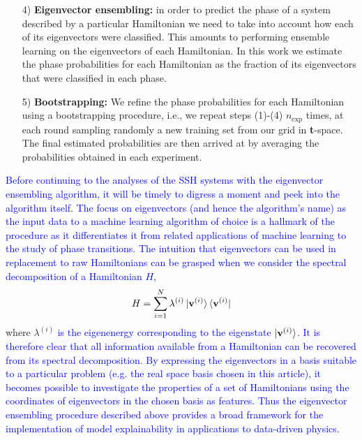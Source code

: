 \documentclass[10pt]{revtex4-1}
\newcommand{\citequote}[1]{\ref{#1}}
\begin{document}
{\begin{enumerate}
\item[4)]\textbf{Eigenvector ensembling:} in order to predict the phase of a system described by a particular Hamiltonian we need to take into account how each of its eigenvectors were classified. This amounts to performing ensemble learning on the eigenvectors of each Hamiltonian. In this work we estimate the phase probabilities for each Hamiltonian as the fraction of its eigenvectors that were classified in each phase.
\item[5)] \textbf{Bootstrapping:} We refine the phase probabilities for each Hamiltonian using a bootstrapping procedure, i.e., we repeat steps (1)-(4) $n_\text{exp}$ times, at each round sampling randomly a new training set from our grid in \textbf{t}-space. The final estimated probabilities are then arrived at by averaging the probabilities obtained in each experiment.
\end{enumerate}} 

\vspace{.3cm}
\textcolor{blue}{Before continuing to the analyses of the SSH systems with the eigenvector ensembling algorithm, it will be timely to digress a moment and peek into the algorithm itself. The focus on eigenvectors (and hence the algorithm's name) as the input data to a machine learning algorithm of choice is a hallmark of the procedure as it differentiates it from related applications of machine learning to the study of phase transitions. The intuition that eigenvectors can be used in replacement to raw Hamiltonians can be grasped when we consider the spectral decomposition of a Hamiltonian $H$, }   
\begin{equation}
\label{eigen_decomposition}
H = \sum_{i=1}^{N}\lambda^{(i)} \ket{\mathbf{v}^{(i)}}\bra{\mathbf{v}^{(i)}}
\end{equation}
where $\lambda^{(i)}$ \textcolor{blue}{is the eigenenergy corresponding to the eigenstate $\ket{\mathbf{v}^{(i)}}$. It is therefore clear that all information available from a Hamiltonian can be recovered from its spectral decomposition. By expressing the eigenvectors in a basis suitable to a particular problem (e.g. the real space basis chosen in this article), it becomes possible to investigate the properties of a set of Hamiltonians using the coordinates of eigenvectors in the chosen basis as features. Thus the eigenvector ensembling procedure described above provides a broad framework for the implementation of model explainability in applications to data-driven physics.} 

\end{document}
